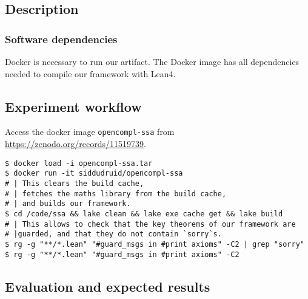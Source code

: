 \documentclass{sigplanconf}
\begin{document}
\subsection{Description}

\subsubsection{Software dependencies}

Docker is necessary to run our artifact.
The Docker image has all dependencies needed to compile our framework with Lean4.



\subsection{Experiment workflow}

Access the docker image \texttt{opencompl-ssa} from
\url{https://zenodo.org/records/11519739}.

\begin{verbatim}
$ docker load -i opencompl-ssa.tar
$ docker run -it siddudruid/opencompl-ssa
# | This clears the build cache,
# | fetches the maths library from the build cache,
# | and builds our framework.
$ cd /code/ssa && lake clean && lake exe cache get && lake build
# | This allows to check that the key theorems of our framework are
# |guarded, and that they do not contain `sorry`s.
$ rg -g "**/*.lean" "#guard_msgs in #print axioms" -C2 | grep "sorry"
$ rg -g "**/*.lean" "#guard_msgs in #print axioms" -C2
\end{verbatim}



\subsection{Evaluation and expected results}
\end{document}
